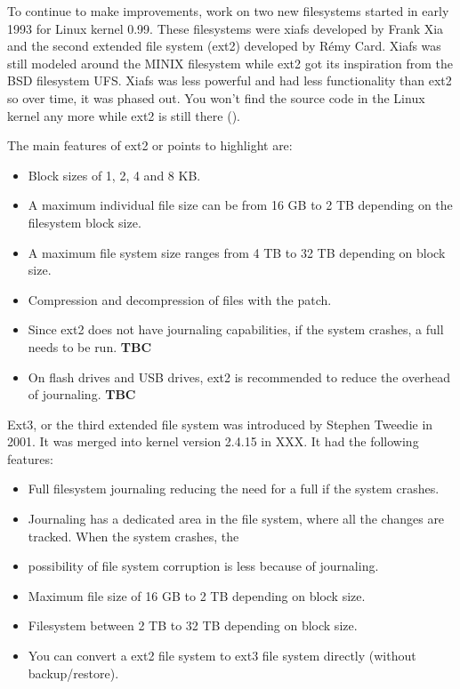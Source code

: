 To continue to make improvements, work on two new filesystems started in early 1993 for Linux kernel 0.99. These filesystems were xiafs developed by Frank Xia and the second extended file system (ext2) developed by R\'emy Card. Xiafs was still modeled around the MINIX filesystem while ext2 got its inspiration from the BSD filesystem UFS. Xiafs was less powerful and had less functionality than ext2 so over time, it was phased out. You won't find the source code in the Linux kernel any more while ext2 is still there ().

The main features of ext2 or points to highlight are:

\begin{itemize}
	\item Block sizes of 1, 2, 4 and 8 KB.
	\item A maximum individual file size can be from 16 GB to 2 TB depending on the filesystem block size.
	\item A maximum file system size ranges from 4 TB to 32 TB depending on block size.
	\item Compression and decompression of files with the  patch.
	\item Since ext2 does not have journaling capabilities, if the system crashes, a full  needs to be run. \textbf{TBC}
	\item On flash drives and USB drives, ext2 is recommended to reduce the overhead of journaling. \textbf{TBC}
\end{itemize}

\noindent
Ext3, or the third extended file system was introduced by Stephen Tweedie in 2001. It was merged into kernel version 2.4.15 in XXX. It had the following features:

\begin{itemize}
	\item Full filesystem journaling reducing the need for a full  if the system crashes.
	\item Journaling has a dedicated area in the file system, where all the changes are tracked. When the system crashes, the 	\item possibility of file system corruption is less because of journaling.
	\item Maximum file size of 16 GB to 2 TB depending on block size.
	\item Filesystem between 2 TB to 32 TB depending on block size.
	\item You can convert a ext2 file system to ext3 file system directly (without backup/restore).
\end{itemize}

